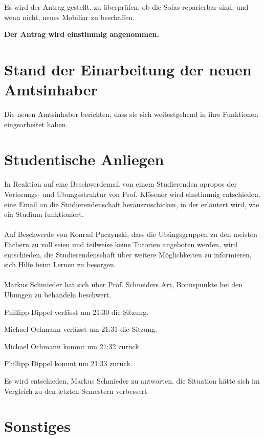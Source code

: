 \documentclass[a4paper, 11pt]{article} %
\begin{document}
Es wird der Antrag gestellt, zu überprüfen, ob die Sofas reparierbar sind, und wenn nicht, neues Mobiliar zu beschaffen.
\begin{center}
	\textbf{Der Antrag wird einstimmig angenommen.}
\end{center}

\section{Stand der Einarbeitung der neuen Amtsinhaber}
Die neuen Amtsinhaber berichten, dass sie sich weitestgehend in ihre Funktionen eingearbeitet haben. 

\section{Studentische Anliegen}
In Reaktion auf eine Beschwerdemail von einem Studierenden apropos der Vorlesungs- und Übungsstruktur von Prof. Klösener wird einstimmig entschieden, eine Email an die Studierendenschaft herauszuschicken, in der erläutert wird, wie ein Studium funktioniert.
\\\\
Auf Beschwerde von Konrad Puczynski, dass die Ubüngsgruppen zu den meisten Fächern zu voll seien und teilweise keine Tutorien angeboten werden, wird entschieden, die Studierendenschaft über weitere Möglichkeiten zu informieren, sich Hilfe beim Lernen zu besorgen.
\\\\
Markus Schmieder hat sich uber Prof. Schneiders Art, Bonuspunkte bei den Ubungen zu behandeln beschwert.
\begin{center}
	Phillipp Dippel verlässt um 21:30 die Sitzung.
\end{center}
\begin{center}
	Michael Ochmann verlässt um 21:31 die Sitzung.
\end{center}
\begin{center}
	Michael Ochmann kommt um 21:32 zurück.
\end{center}
\begin{center}
	Phillipp Dippel kommt um 21:33 zurück.
\end{center}
Es wird entschieden, Markus Schmieder zu antworten, die Situation hätte sich im Vergleich zu den letzten Semestern verbessert.
\section{Sonstiges}
\end{document}

